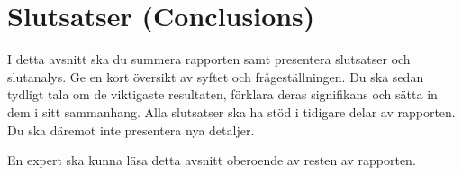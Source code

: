 \section{Slutsatser (Conclusions)}

I detta avsnitt ska du summera rapporten samt presentera slutsatser och slutanalys. Ge en kort översikt av syftet och frågeställningen. Du ska sedan tydligt tala om de viktigaste resultaten, förklara deras signifikans och sätta in dem i sitt sammanhang. Alla slutsatser ska ha stöd i tidigare delar av rapporten.  Du ska däremot inte presentera nya detaljer. 

En expert ska kunna läsa detta avsnitt oberoende av resten av rapporten. 

